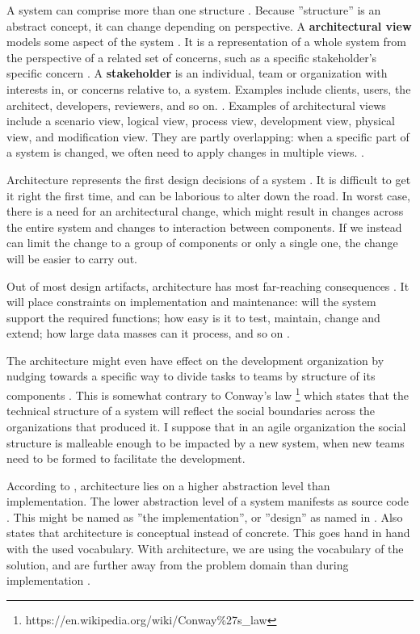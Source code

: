 \documentclass[utf8,english]{gradu3}
\begin{document}
A system can comprise more than one structure \parencite[23]{Bass1998}. Because
''structure'' is an abstract concept, it can change depending on perspective. A
\textbf{architectural view} models some aspect of the system \parencite{Koskimies2005}. It is a
representation of a whole system from the perspective of a related set of
concerns, such as a specific stakeholder's specific concern \parencite[3]{IEEE42010}. A
\textbf{stakeholder} is an individual, team or organization with interests in, or
concerns relative to, a system. Examples include clients, users, the architect,
developers, reviewers, and so on. \parencite[3]{IEEE42010}. Examples of architectural
views include a scenario view, logical view, process view,
development view, physical view, and modification view. They are partly
overlapping: when a specific part of a system is changed, we often need to apply
changes in multiple views. \parencite{Koskimies2005}.

Architecture represents the first design decisions of a system \parencite{Bass1998}. It is
difficult to get it right the first time, and can be laborious to alter down the
road. In worst case, there is a need for an architectural change, which might
result in changes across the entire system and changes to interaction between
components. If we instead can limit the change to a group of components or only
a single one, the change will be easier to carry out. \parencite[31]{Bass1998}

Out of most design artifacts, architecture has most far-reaching consequences
\parencite[31]{Bass1998}. It will place constraints on implementation and
maintenance: will the system support the required functions;
how easy is it to test, maintain, change and extend; how large data masses can
it process, and so on \parencite{Koskimies2005}.

The architecture might even have effect on the development organization by
nudging towards a specific way to divide tasks to teams by structure of its
components \parencite[31]{Bass1998}. This is somewhat contrary to Conway's law
\footnote{https://en.wikipedia.org/wiki/Conway\%27s\_law} which states that the
technical structure of a system will reflect the social boundaries across the
organizations that produced it. I suppose that in an agile organization the
social structure is malleable enough to be impacted by a new system, when new
teams need to be formed to facilitate the development.

According to \textcite{Koskimies2005}, architecture lies on a higher
abstraction level than implementation. The lower abstraction level of a system
manifests as source code \parencite[24]{Bass1998}. This might be named as ''the
implementation'', or ''design'' as named in \textcite{IEEE12207}. Also \textcite[4]{IEEE42010} states
that architecture is conceptual instead of concrete. This goes hand in hand with
the used vocabulary. With architecture, we are using the vocabulary of the
solution, and are further away from the problem domain than during
implementation \parencite{Koskimies2005}.
\end{document}
